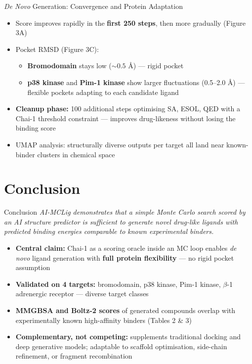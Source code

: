 \documentclass{beamer}
\begin{document}

\begin{frame}{\textit{De Novo} Generation: Convergence and Protein Adaptation}
  \begin{itemize}
    \item Score improves rapidly in the \textbf{first 250 steps}, then more gradually (Figure 3A)
    \item Pocket RMSD (Figure 3C):
      \begin{itemize}
        \item \textbf{Bromodomain} stays low (${\sim}0.5$ \AA) --- rigid pocket
        \item \textbf{p38 kinase} and \textbf{Pim-1 kinase} show larger fluctuations (0.5--2.0 \AA) --- flexible pockets adapting to each candidate ligand
      \end{itemize}
    \item \textbf{Cleanup phase:} 100 additional steps optimising SA, ESOL, QED with a Chai-1 threshold constraint --- improves drug-likeness without losing the binding score
    \item UMAP analysis: structurally diverse outputs per target all land near known-binder clusters in chemical space
  \end{itemize}
\end{frame}

\section{Conclusion}

\begin{frame}{Conclusion}
  \textit{AI-MCLig demonstrates that a simple Monte Carlo search scored by an AI structure predictor is sufficient to generate novel drug-like ligands with predicted binding energies comparable to known experimental binders.}

  \vspace{0.6em}
  \begin{itemize}
    \item \textbf{Central claim:} Chai-1 as a scoring oracle inside an MC loop enables \textit{de novo} ligand generation with \textbf{full protein flexibility} --- no rigid pocket assumption
    \item \textbf{Validated on 4 targets:} bromodomain, p38 kinase, Pim-1 kinase, $\beta$-1 adrenergic receptor --- diverse target classes
    \item \textbf{MMGBSA and Boltz-2 scores} of generated compounds overlap with experimentally known high-affinity binders (Tables 2 \& 3)
    \item \textbf{Complementary, not competing:} supplements traditional docking and deep generative models; adaptable to scaffold optimisation, side-chain refinement, or fragment recombination
  \end{itemize}
\end{frame}
\end{document}
